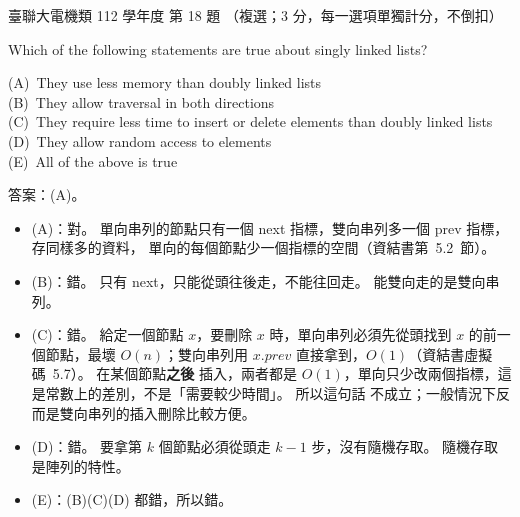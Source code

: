 \begin{pastexam}[label={px:ust-112-ee-ds-18}]{臺聯大電機類 112 學年度 第 18 題}
（複選；3 分，每一選項單獨計分，不倒扣）

Which of the following statements are true about singly linked lists?

(A)~They use less memory than doubly linked lists\\
(B)~They allow traversal in both directions\\
(C)~They require less time to insert or delete elements than doubly linked lists\\
(D)~They allow random access to elements\\
(E)~All of the above is true
\end{pastexam}

\begin{pastsoln}
答案：(A)。

\begin{itemize}
\item (A)：對。 單向串列的節點只有一個 next 指標，雙向串列多一個 prev 指標，存同樣多的資料，
單向的每個節點少一個指標的空間（資結書第~5.2~節）。
\item (B)：錯。 只有 next，只能從頭往後走，不能往回走。 能雙向走的是雙向串列。
\item (C)：錯。 給定一個節點 $x$，要刪除 $x$ 時，單向串列必須先從頭找到 $x$ 的前一個節點，最壞
$O(n)$；雙向串列用 $x.\mathit{prev}$ 直接拿到，$O(1)$（資結書虛擬碼~5.7）。 在某個節點\textbf{之後}
插入，兩者都是 $O(1)$，單向只少改兩個指標，這是常數上的差別，不是「需要較少時間」。 所以這句話
不成立；一般情況下反而是雙向串列的插入刪除比較方便。
\item (D)：錯。 要拿第 $k$ 個節點必須從頭走 $k - 1$ 步，沒有隨機存取。 隨機存取是陣列的特性。
\item (E)：(B)(C)(D) 都錯，所以錯。
\end{itemize}
\end{pastsoln}
